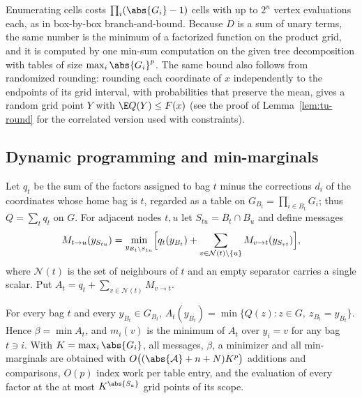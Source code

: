 Enumerating cells costs $\prod_i(\abs{G_i}-1)$ cells with up to $2^n$ vertex
evaluations each, as in box-by-box branch-and-bound. Because $D$ is a sum of
unary terms, the same number is the minimum of a factorized function on the
product grid, and it is computed by one min-sum computation on the given tree
decomposition with tables of size $\max_i\abs{G_i}^p$. The same bound also
follows from randomized rounding: rounding each coordinate of $x$
independently to the endpoints of its grid interval, with probabilities that
preserve the mean, gives a random grid point $Y$ with $\E Q(Y)\le F(x)$
(see the proof of Lemma~\ref{lem:tu-round} for the correlated version used with
constraints).

\subsection{Dynamic programming and min-marginals}
Let $q_t$ be the sum of the factors assigned to bag $t$ minus the corrections
$d_i$ of the coordinates whose home bag is $t$, regarded as a table on
$G_{B_t}=\prod_{i\in B_t}G_i$; thus $Q=\sum_tq_t$ on $G$. For adjacent nodes
$t,u$ let $S_{tu}=B_t\cap B_u$ and define messages
\begin{equation}\label{eq:messages}
M_{t\to u}(y_{S_{tu}})=\min_{y_{B_t\setminus S_{tu}}}\Bigl[q_t(y_{B_t})
+\sum_{v\in\mathcal N(t)\setminus\{u\}}M_{v\to t}(y_{S_{vt}})\Bigr],
\end{equation}
where $\mathcal N(t)$ is the set of neighbours of $t$ and an empty separator
carries a single scalar. Put
$A_t=q_t+\sum_{v\in\mathcal N(t)}M_{v\to t}$.

\begin{lemma}\label{lem:dp}
For every bag $t$ and every $y_{B_t}\in G_{B_t}$,
$A_t(y_{B_t})=\min\{Q(z):z\in G,\ z_{B_t}=y_{B_t}\}$. Hence $\beta=\min A_t$, and
$m_i(v)$ is the minimum of $A_t$ over $y_i=v$ for any bag $t\ni i$. With
$K=\max_i\abs{G_i}$, all messages, $\beta$, a minimizer and all min-marginals
are obtained with $O\bigl((\abs{\mathcal A}+n+N)K^p\bigr)$ additions and
comparisons, $O(p)$ index work per table entry, and the evaluation of every
factor at the at most $K^{\abs{S_a}}$ grid points of its scope.
\end{lemma}

